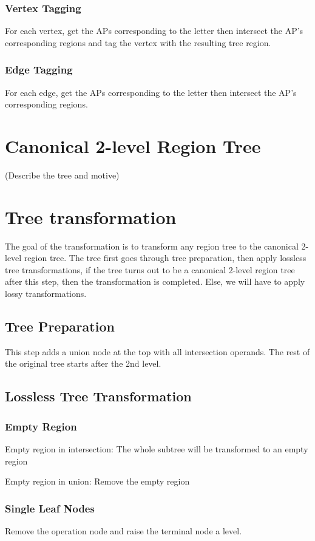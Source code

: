 \documentclass[letterpaper, 10 pt, conference]{ieeeconf}  %
\begin{document}
\subsubsection{Vertex Tagging}
For each vertex, get the APs corresponding to the letter then intersect the AP's corresponding regions and tag the vertex with the resulting tree region.
\subsubsection{Edge Tagging}
For each edge, get the APs corresponding to the letter then intersect the AP's corresponding regions.
\section{Canonical 2-level Region Tree}

(Describe the tree and motive)

\section{Tree transformation}
The goal of the transformation is to transform any region tree to the canonical 2-level region tree. The tree first goes through tree preparation, then apply lossless tree transformations, if the tree turns out to be a canonical 2-level region tree after this step, then the transformation is completed. Else, we will have to apply lossy transformations.
\subsection{Tree Preparation}
This step adds a union node at the top with all intersection operands. The rest of the original tree starts after the 2nd level.
\subsection{Lossless Tree Transformation}

\subsubsection{Empty Region}

Empty region in intersection:
The whole subtree will be transformed to an empty region

Empty region in union:
Remove the empty region
		
		
\subsubsection{Single Leaf Nodes}
Remove the operation node and raise the terminal node a level.
	
\end{document}
